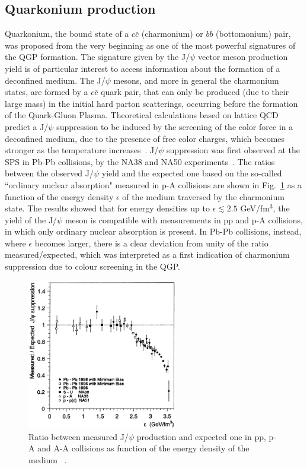 \subsection{Quarkonium production}
\label{sec:Quarkonium}
Quarkonium, the bound state of a $c\bar{c}$ (charmonium) or $b\bar{b}$ 
(bottomonium) pair, was proposed from the very beginning as one of the 
most powerful signatures of the QGP formation.
The signature given by the J/$\psi$ vector meson production yield is of particular interest
to access information about the formation of a deconfined medium.
The J/$\psi$ mesons, and more in general the charmonium states, are formed 
by a $c\bar{c}$ quark pair, that can only be produced (due to their large mass) 
in the initial hard parton scatterings, occurring before the formation of the 
Quark-Gluon Plasma. Theoretical calculations based on lattice QCD 
predict a J/$\psi$ suppression to be induced by the screening of the color 
force in a deconfined medium, due to the presence of free 
color charges, which becomes stronger as the temperature 
increases~\cite{Abreu:2000ni,Matsui:1986dk}. 
J/$\psi$ suppression was first observed at the SPS in Pb-Pb collisions, by 
the NA38 and NA50 experiments~\cite{Abreu:2000ni}.
The ratios between the observed J/$\psi$ yield and the expected one 
based on the so-called ``ordinary nuclear absorption" measured in p-A 
collisions are shown in Fig.~\ref{fig:JPsiSuppressionNA50} 
as a function of the energy density $\epsilon$ of the medium traversed by the charmonium state. 
The results showed that for energy densities up to $\epsilon \lesssim 2.5$ GeV/fm$^3$, 
the yield of the J/$\psi$ meson is compatible with measurements in pp 
and p-A collisions, in which only ordinary nuclear absorption is present. In Pb-Pb 
collisions, instead, where $\epsilon$ becomes larger, there is a clear deviation from 
unity of the ratio measured/expected, which was interpreted as a first indication of 
charmonium suppression due to colour screening in the QGP.
\begin{figure}[!ht]
  \centering
  \includegraphics[width=6.6cm]{FigCap1/JPsiSuppressionNA50.eps}
  \caption{Ratio between measured J/$\psi$ production and expected one in pp, p-A and A-A collisions as function of the energy density of the medium ~\cite{Abreu:2000ni}.}
  \label{fig:JPsiSuppressionNA50}
\end{figure}
